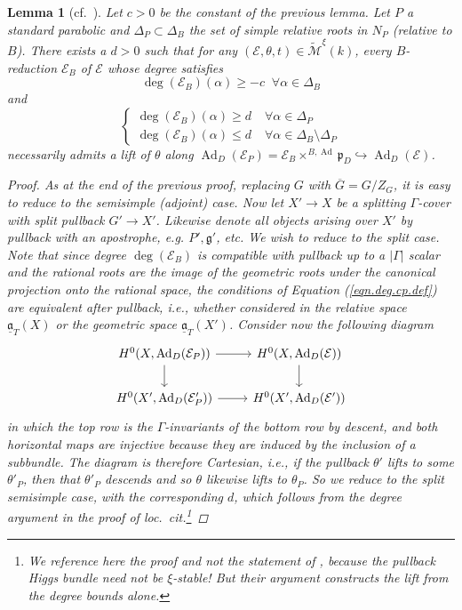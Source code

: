 \documentclass[openany]{amsbook}
\newtheorem{lemma}[theorem]{Lemma}
\theoremstyle{definition}
\theoremstyle{remark}
\numberwithin{equation}{section}
\newcommand{\cM}{\mathcal{M}}
\newcommand{\cE}{\mathcal{E}}
\newcommand{\ol}[1]{\overline{#1}}
\newcommand{\ul}[1]{\underline{#1}}
\renewcommand{\-}{\operatorname{-}}
\renewcommand{\a}{\mathfrak{a}}
\newcommand{\on}[1]{\operatorname{#1}}
\newcommand{\ctM}{\widetilde{\cM}}
\newcommand{\fp}{\mathfrak{p}}
\renewcommand{\fg}{\mathfrak{g}}
\begin{document}
\begin{lemma}[{{cf.\ \cite[Lemme 6.1.7]{CLI}}}]
    Let $c >0$ be the constant of the previous lemma. Let $P$ a standard parabolic and $\Delta_P \subset \Delta_B$ the set of simple relative roots in $N_P$ (relative to $B$). There exists a $d > 0$ such that for any $(\cE, \theta, t) \in \ctM^\xi(k)$, every $B$-reduction $\cE_B$ of $\cE$ whose degree satisfies
    $$
    \deg(\cE_B)(\alpha) \ge -c \; \;\forall \alpha \in \Delta_B 
    $$
    and \begin{equation}\label{eqn.deg.cp.def}
        \begin{cases}
            \deg(\cE_B)(\alpha) \ge d &\; \forall \alpha \in \Delta_P \\
            \deg(\cE_B)(\alpha) \le d &\; \forall \alpha \in \Delta_B \setminus \Delta_P
        \end{cases}
    \end{equation}
    necessarily admits a lift of $\theta$ along $\on{Ad}_D(\cE_P) = \cE_B \times^{B,\on{Ad}} \fp_D \hookrightarrow \on{Ad}_D(\cE)$.
    \begin{proof}
        As at the end of the previous proof, replacing $G$ with $\ol{G} = G/Z_G$, it is easy to reduce to the semisimple (adjoint) case. Now let $X' \to X$ be a splitting $\Gamma$-cover with split pullback $G' \to X'$. Likewise denote all objects arising over $X'$ by pullback with an apostrophe, e.g. $P', \fg'$, etc. We wish to reduce to the split case. Note that since degree $\deg(\cE_B)$ is compatible with pullback up to a $|\Gamma|$ scalar and the rational roots are the image of the geometric roots under the canonical projection onto the rational space, the conditions of Equation (\ref{eqn.deg.cp.def}) are equivalent after pullback, i.e., whether considered in the relative space $\ul{\a}_T(X)$ or the geometric space $\ul{\a}_T(X')$. Consider now the following diagram
        $$
        \begin{tikzcd}[ampersand replacement=\&]
            H^0(X, \on{Ad}_D(\cE_P)) \ar[r] \ar[d] \& H^0(X, \on{Ad}_D(\cE)) \ar[d] \\
            H^0(X', \on{Ad}_D(\cE_P')) \ar[r] \& H^0(X',\on{Ad}_D(\cE')) 
        \end{tikzcd}$$
        in which the top row is the $\Gamma$-invariants of the bottom row by descent, and both horizontal maps are injective because they are induced by the inclusion of a subbundle. The diagram is therefore Cartesian, i.e., if the pullback $\theta'$ lifts to some $\theta'_P$, then that $\theta'_P$ descends and so $\theta$ likewise lifts to $\theta_P$. So we reduce to the split semisimple case, with the corresponding $d$, which follows from the degree argument in the proof of \textit{loc.\ cit.}\footnote{We reference here the proof and not the statement of \cite[Lemma 6.1.7]{CLI}, because the pullback Higgs bundle need not be $\xi$-stable! But their argument constructs the lift from the degree bounds alone.}
    \end{proof}
\end{lemma}
\end{document}
